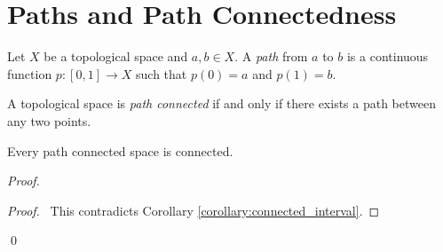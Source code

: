 \section{Paths and Path Connectedness}

\begin{definition}[Path]
    Let $X$ be a topological space and $a, b \in X$. A \emph{path} from $a$ to $b$ is a continuous function $p : [0,1] \rightarrow X$
    such that $p(0) = a$ and $p(1) = b$.
\end{definition}

\begin{definition}
    A topological space is \emph{path connected} if and only if there exists a path between any two points.
\end{definition}

\begin{proposition}
    \label{proposition:connected_path_connected}
    Every path connected space is connected.
\end{proposition}

\begin{proof}
    \pf
    \qedstep
    \begin{proof}
        \pf\ This contradicts Corollary \ref{corollary:connected_interval}.
    \end{proof}
    \qed
\end{proof}

